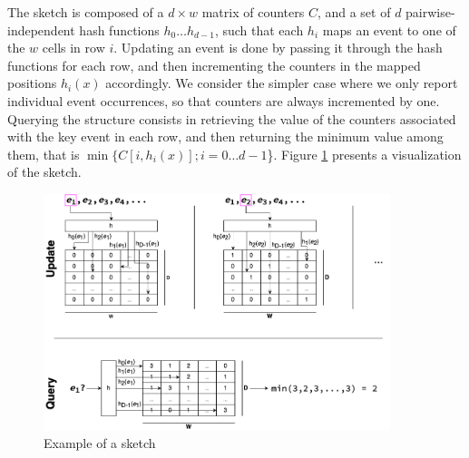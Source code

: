 The sketch is composed of a $d\times w$ matrix of counters $C$, and a set of $d$ pairwise-independent hash functions $h_0\ldots h_{d-1}$, such that each $h_i$ maps an event to one of the $w$ cells in row $i$.
Updating an event is done by passing it through the hash functions for each row, and then incrementing the counters in
the mapped positions $h_i(x)$ accordingly. 
We consider the simpler case where we only report individual event occurrences, so that counters are always incremented by one.
Querying the structure consists in retrieving the value of the counters associated with the key event in each row,  and then returning
the minimum value among them, that is $\min\{C[i,h_i(x)]; i=0\ldots d-1$\}.
Figure \ref{fig:countminexample} presents a visualization of the \cm sketch.

\begin{figure}[htbp]
	\begin{center}
    \includegraphics[width=0.9\textwidth]{figures/cm-example}
	\end{center}
	\caption{Example of a \cm sketch}\label{fig:countminexample}
\end{figure}

